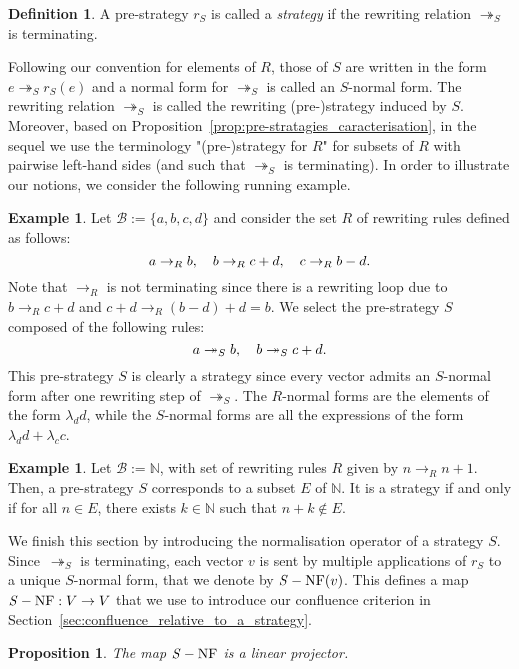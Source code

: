 \documentclass[10pt]{easychair}
\newtheorem{proposition}[theorem]{Proposition}
\theoremstyle{definition}
\newtheorem{definition}[theorem]{Definition}
\newtheorem{example}[theorem]{Example}
\newcommand\basis{\mathscr{B}}
\newcommand\rewR{\to_R}
\newcommand\rewS{\twoheadrightarrow_S}
\DeclareMathOperator{\SNF}{{\it S}-NF}
\begin{document}
\begin{definition}
  A pre-strategy $r_S$ is called a {\em strategy} if the rewriting 
  relation $\rewS$ is terminating. 
\end{definition}
\smallskip

Following our convention for elements of $R$, those of $S$ are written in
the form $e\rewS r_S(e)$ and a normal form for $\rewS$ is called an
$S$-normal form. The rewriting relation $\rewS$ is called the rewriting
(pre-)strategy induced by $S$. Moreover, based on
Proposition~\ref{prop:pre-stratagies_caracterisation}, in the sequel we
use the terminology "(pre-)strategy for $R$" for subsets of $R$ with
pairwise left-hand sides (and such that $\rewS$ is terminating). In order
to illustrate our notions, we consider the following running example.
\smallskip

\begin{example}\label{ex:h_norma_form}
  Let $\basis:=\{a,b,c,d\}$ and consider the set $R$ of rewriting rules
  defined as follows:
  \[a\rewR b,\quad b\rewR c+d,\quad c\rewR b-d.
  \smallskip\]
  Note that $\rewR$ is not terminating since there is a rewriting loop
  due to $b\rewR c+d$ and $c+d\rewR (b-d)+d=b$. We select the
  pre-strategy $S$ composed of the following rules:
  \[a\rewS b,\quad b\rewS c+d.
  \smallskip\]
  This pre-strategy $S$ is clearly a strategy since every vector admits
  an $S$-normal form after one rewriting step of $\rewS$. The $R$-normal
  forms are the elements of the form $\lambda_dd$, while the $S$-normal
  forms are all the expressions of the form $\lambda_dd+\lambda_cc$.
\end{example}

\begin{example}\label{ex:case_N}
  Let $\basis:= \mathbb N$, with set of rewriting rules $R$ given by
  $n \rewR n+1$. Then, a pre-strategy $S$ corresponds to a subset $E$ of
  $\mathbb N$. It is a strategy if and only if for all $n \in E$, there
  exists $k \in \mathbb N$ such that $n + k \notin E$. 
\end{example}
\smallskip

We finish this section by introducing the normalisation operator of a
strategy $S$. Since~$\rewS$ is terminating, each vector $v$ is sent by
multiple applications of $r_S$ to a unique $S$-normal form, that we
denote by $\SNF(v)$. This defines a map $\SNF:V\to V$ that we use to
introduce our confluence criterion in
Section~\ref{sec:confluence_relative_to_a_strategy}.
\medskip

\begin{proposition}\label{prop:linearity_of_H}
  The map $\SNF$ is a linear projector.
\end{proposition}
\end{document}
